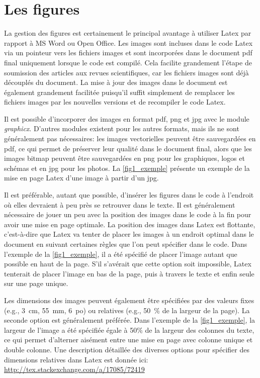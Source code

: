 \documentclass[../exemple_master.tex]{subfiles}
\begin{document}
\section{Les figures}

La gestion des figures est certainement le principal avantage à utiliser Latex par rapport à MS Word ou Open Office. Les images sont incluses dans le code Latex via un pointeur vers les fichiers images et sont incorporées dans le document pdf final uniquement lorsque le code est compilé. Cela facilite grandement l'étape de soumission des articles aux revues scientifiques, car les fichiers images sont déjà découplés du document. La mise à jour des images dans le document est également grandement facilitée puisqu'il suffit simplement de remplacer les fichiers images par les nouvelles versions et de recompiler le code Latex.

Il est possible d'incorporer des images en format pdf, png et jpg avec le module \emph{graphicx}. D'autres modules existent pour les autres formats, mais ils ne sont généralement pas nécessaires: les images vectorielles peuvent être sauvegardées en pdf, ce qui permet de préserver leur qualité dans le document final, alors que les images bitmap peuvent être sauvegardées en png pour les graphiques, logos et schémas et en jpg pour les photos. La \cref{fig1_exemple} présente un exemple de la mise en page Latex d'une image à partir d'un jpg.

Il est préférable, autant que possible, d'insérer les figures dans le code à l'endroit où elles devraient à peu près se retrouver dans le texte. Il est généralement nécessaire de jouer un peu avec la position des images dans le code à la fin pour avoir une mise en page optimale. La position des images dans Latex est flottante, c'est-à-dire que Latex va tenter de placer les images à un endroit optimal dans le document en suivant certaines règles que l'on peut spécifier dans le code. Dans l'exemple de la \cref{fig1_exemple}, il a été spécifié de placer l'image autant que possible en haut de la page. S'il s'avérait que cette option soit impossible, Latex tenterait de placer l'image en bas de la page, puis à travers le texte et enfin seule sur une page unique.

Les dimensions des images peuvent également être spécifiées par des valeurs fixes (e.g., \SI{3}{cm}, \SI{55}{mm}, \SI{6}{po}) ou relatives (e.g., \SI{50}{\percent} de la largeur de la page). La seconde option est généralement préférée. Dans l'exemple de la \cref{fig1_exemple}, la largeur de l'image a été spécifiée égale à 50\% de la largeur des colonnes du texte, ce qui permet d'alterner aisément entre une mise en page avec colonne unique et double colonne. Une description détaillée des diverses options pour spécifier des dimensions relatives dans Latex est donnée ici: \url{http://tex.stackexchange.com/a/17085/72419}
\end{document}
